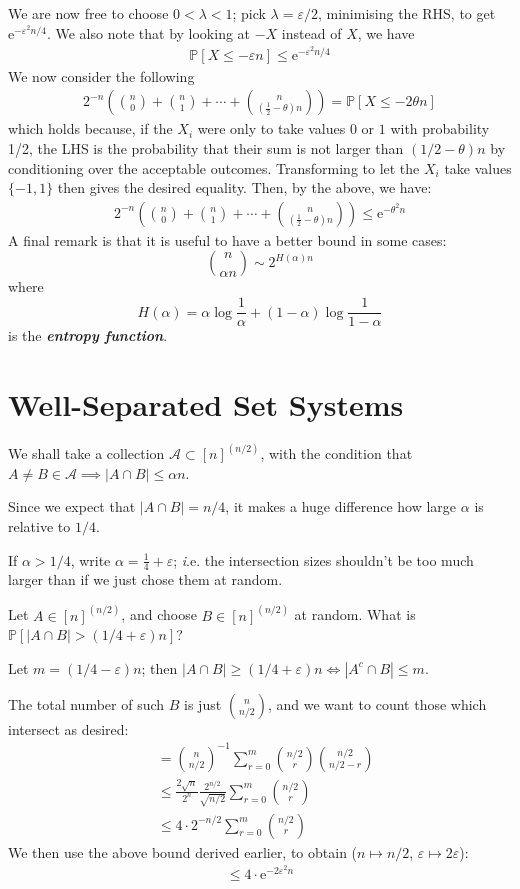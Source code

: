 \documentclass[]{article}
\theoremstyle{custhm}
\theoremstyle{cusdef}
\theoremstyle{custhm}
\theoremstyle{custhm}
\theoremstyle{custhm}
\theoremstyle{custhm}
\theoremstyle{cusdef}
\theoremstyle{remark}
\newcommand{\e}{\mathrm{e}}
\newcommand{\eps}{\varepsilon}
\renewcommand{\P}{\mathbb{P}}
\newcommand{\undf}[1]{\textit{\textbf{#1}}}
\renewcommand{\it}[1]{\textit{#1}}
\newcommand{\A}{\mathcal{A}}
\begin{document}
We are now free to choose $0 < \lambda < 1$; pick $\lambda = \eps/2$, minimising the RHS, to get $\e^{-\eps^2 n/4}$. We also note that by looking at $-X$ instead of $X$, we have
\begin{align*}
\P[X\le -\eps n] \le \e^{-\eps^2n/4}
\end{align*}
We now consider the following
\begin{align*}
2^{-n}\left(\binom{n}{0} +\binom{n}{1}+\cdots+\binom{n}{\left(\frac{1}{2}-\theta\right)n}\right) = \P[X \le -2\theta n]
\end{align*}
which holds because, if the $X_i$ were only to take values $0$ or $1$ with probability 1/2, the LHS is the probability that their sum  is not larger than $(1/2 - \theta)n$ by conditioning over the acceptable outcomes. Transforming to let the $X_i$ take values $\{-1,1\}$ then gives the desired equality. Then, by the above, we have:
\begin{align*}
2^{-n}\left(\binom{n}{0} +\binom{n}{1}+\cdots+\binom{n}{\left(\frac{1}{2}-\theta\right)n}\right) \le \e^{-\theta^2 n}
\end{align*}
A final remark is that it is useful to have a better bound in some cases:
\[
\binom{n}{\alpha n} \sim 2^{H(\alpha)n}
\]
where
\[
H(\alpha) = \alpha \log \frac{1}{\alpha} + (1-\alpha)\log \frac{1}{1-\alpha}
\]
is the \undf{entropy function}.

\section{Well-Separated Set Systems}

We shall take a collection $\A\subset [n]^{(n/2)}$, with the condition that $A\ne B\in \A\implies |A\cap B|\le \alpha n$.

Since we expect that $|A\cap B| = n/4$, it makes a huge difference how large $\alpha$ is relative to $1/4$.

If $\alpha > 1/4$, write $\alpha = \frac{1}{4}+\eps$; {\it i.e.} the intersection sizes shouldn't be too much larger than if we just chose them at random.

Let $A \in [n]^{(n/2)}$, and choose $B\in [n]^{(n/2)}$ at random. What is $\P[|A\cap B| >(1/4+\eps)n]$?

Let $m = (1/4 - \eps)n$; then $|A\cap B| \ge (1/4 + \eps)n \iff |A^c\cap B| \le m$.

The total number of such $B$ is just $\binom{n}{n/2}$, and we want to count those which intersect as desired:
\begin{align*}
 &=\binom{n}{n/2}^{-1}\sum_{r=0}^{m}\binom{n/2}{r}\binom{n/2}{n/2-r}\\
 &\le \frac{2\sqrt{n}}{2^n}\frac{2^{n/2}}{\sqrt{n/2}}\sum_{r=0}^{m}\binom{n/2}{r}\\
 &\le 4 \cdot 2^{-n/2}\sum_{r=0}^{m}\binom{n/2}{r}
\end{align*}
We then use the above bound derived earlier, to obtain ($n\mapsto n/2$, $\eps \mapsto 2\eps$):
\begin{align*}
\le 4\cdot \e^{-2\eps^2 n}
\end{align*}
\end{document}
